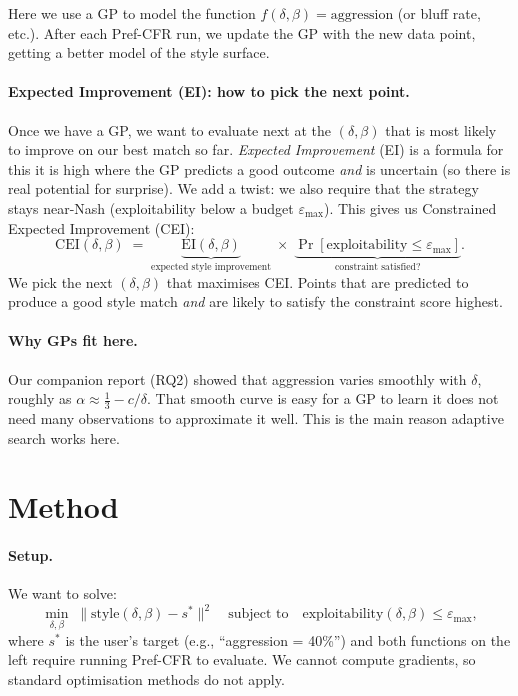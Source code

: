 \documentclass{article}
\begin{document}
Here we use a GP to model the function $f(\delta, \beta) = \text{aggression}$
(or bluff rate, etc.).  After each Pref-CFR run, we update the GP with the new
data point, getting a better model of the style surface.

\paragraph{Expected Improvement (EI): how to pick the next point.}
Once we have a GP, we want to evaluate next at the $(\delta, \beta)$ that is
most likely to improve on our best match so far.  \emph{Expected Improvement}
(EI) is a formula for this it is high where the GP predicts a good outcome
\emph{and} is uncertain (so there is real potential for surprise).  We add a
twist: we also require that the strategy stays near-Nash (exploitability below
a budget $\varepsilon_{\max}$).  This gives us Constrained Expected
Improvement (CEI):
\begin{equation}
  \mathrm{CEI}(\delta,\beta) \;=\;
  \underbrace{\mathrm{EI}(\delta,\beta)}_{\text{expected style improvement}}
  \;\times\;
  \underbrace{\Pr[\text{exploitability} \le \varepsilon_{\max}]}_{\text{constraint satisfied?}}.
  \label{eq:cei}
\end{equation}
We pick the next $(\delta, \beta)$ that maximises CEI.  Points that are
predicted to produce a good style match \emph{and} are likely to satisfy the
constraint score highest.

\paragraph{Why GPs fit here.}
Our companion report (RQ2) showed that aggression varies smoothly with
$\delta$, roughly as $\alpha \approx \tfrac{1}{3} - c/\delta$.  That smooth
curve is easy for a GP to learn it does not need many observations to
approximate it well.  This is the main reason adaptive search works here.

\section{Method}
\label{sec:method}

\paragraph{Setup.}
We want to solve:
\begin{equation}
  \min_{\delta,\beta}\;\|\text{style}(\delta,\beta)-s^*\|^2
  \quad\text{subject to}\quad \text{exploitability}(\delta,\beta)\le\varepsilon_{\max},
  \label{eq:opt}
\end{equation}
where $s^*$ is the user's target (e.g., ``aggression = 40\%'') and both
functions on the left require running Pref-CFR to evaluate.  We cannot compute
gradients, so standard optimisation methods do not apply.
\end{document}
